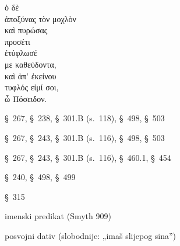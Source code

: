 

{\large
\begin{greek}
\noindent ὁ δὲ \\
\tabto{2em} ἀποξύνας τὸν μοχλὸν \\
\tabto{2em} καὶ πυρώσας \\
\tabto{2em} προσέτι \\
ἐτύφλωσέ \\
\tabto{2em} με καθεύδοντα, \\
καὶ ἀπ' ἐκείνου \\
τυφλός εἰμί σοι, \\
ὦ Πόσειδον.\\

\end{greek}
}

\begin{description}[noitemsep]
\item[ἀποξύνας] §~267, §~238, §~301.B (s.~118), §~498, §~503
\item[πυρώσας] §~267, §~243, §~301.B (s.~116), §~498, §~503
\item[ἐτύφλωσέ] §~267, §~243, §~301.B (s.~116), §~460.1, §~454
\item[καθεύδοντα] §~240, §~498, §~499%
\item[εἰμί] §~315
\item[τυφλός εἰμί] imenski predikat (Smyth 909)
\item[σοι] posvojni dativ (slobodnije: „imaš slijepog sina”)

\end{description}



